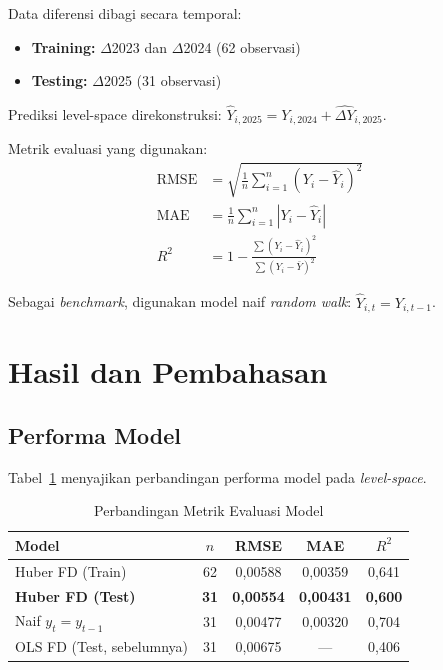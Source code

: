 \documentclass[12pt,a4paper]{article}
\begin{document}
Data diferensi dibagi secara temporal:
\begin{itemize}
\item \textbf{Training:} $\Delta$2023 dan $\Delta$2024 (62 observasi)
\item \textbf{Testing:} $\Delta$2025 (31 observasi)
\end{itemize}

Prediksi level-space direkonstruksi: $\hat{Y}_{i,2025} = Y_{i,2024} + \widehat{\Delta Y}_{i,2025}$.

Metrik evaluasi yang digunakan:
\begin{align}
\text{RMSE} &= \sqrt{\frac{1}{n}\sum_{i=1}^{n}(Y_i - \hat{Y}_i)^2} \\
\text{MAE} &= \frac{1}{n}\sum_{i=1}^{n}|Y_i - \hat{Y}_i| \\
R^2 &= 1 - \frac{\sum(Y_i - \hat{Y}_i)^2}{\sum(Y_i - \bar{Y})^2}
\end{align}

Sebagai \textit{benchmark}, digunakan model naif \textit{random walk}: $\hat{Y}_{i,t} = Y_{i,t-1}$.

\section{Hasil dan Pembahasan}

\subsection{Performa Model}

Tabel~\ref{tab:metrics} menyajikan perbandingan performa model pada \textit{level-space}.

\begin{table}[H]
\centering
\caption{Perbandingan Metrik Evaluasi Model}
\label{tab:metrics}
\begin{tabular}{lcccc}
\toprule
\textbf{Model} & \textbf{$n$} & \textbf{RMSE} & \textbf{MAE} & \textbf{$R^2$} \\
\midrule
Huber FD (Train) & 62 & 0,00588 & 0,00359 & 0,641 \\
\textbf{Huber FD (Test)} & \textbf{31} & \textbf{0,00554} & \textbf{0,00431} & \textbf{0,600} \\
Naif $y_t = y_{t-1}$ & 31 & 0,00477 & 0,00320 & 0,704 \\
\midrule
OLS FD (Test, sebelumnya) & 31 & 0,00675 & --- & 0,406 \\
\bottomrule
\end{tabular}
\end{table}
\end{document}
